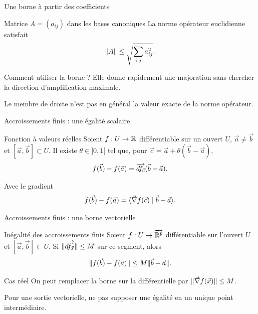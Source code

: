 \begin{frame}[t]{Une borne à partir des coefficients}
\coursanalyse
\begin{theoreme}{Matrice $A=(a_{ij})$ dans les bases canoniques}
La norme opérateur euclidienne satisfait
\[\lVert A\rVert\le\sqrt{\sum_{i,j}a_{ij}^2}.\]
\end{theoreme}
\begin{cours}{Comment utiliser la borne ?}
Elle donne rapidement une majoration sans chercher la direction d'amplification maximale.
\end{cours}
\vfill Le membre de droite n'est pas en général la valeur exacte de la norme opérateur.
\end{frame}

\begin{frame}[t]{Accroissements finis : une égalité scalaire}
\coursanalyse
\begin{theoreme}{Fonction à valeurs réelles}
Soient $f:U\to\mathbb R$ différentiable sur un ouvert $U$, $\vec a\ne\vec b$ et $[\vec a,\vec b]\subset U$.
Il existe $\theta\in]0,1[$ tel que, pour $\vec c=\vec a+\theta(\vec b-\vec a)$,
\[f(\vec b)-f(\vec a)=\overrightarrow{df_{\vec c}}(\vec b-\vec a).\]
\end{theoreme}
\begin{resultat}{Avec le gradient}
\[f(\vec b)-f(\vec a)=\langle \vec\nabla f(\vec c)\mid \vec b-\vec a\rangle.\]
\end{resultat}
\end{frame}

\begin{frame}[t]{Accroissements finis : une borne vectorielle}
\coursanalyse
\begin{theoreme}{Inégalité des accroissements finis}
Soient $f:U\to\overrightarrow{\mathbb R^{p}}$ différentiable sur l'ouvert $U$ et $[\vec a,\vec b]\subset U$.
Si $\lVert \overrightarrow{df_{\vec x}}\rVert\le M$ sur ce segment, alors
\[\lVert f(\vec b)-f(\vec a)\rVert\le M\lVert \vec b-\vec a\rVert.\]
\end{theoreme}
\begin{resultat}{Cas réel}
On peut remplacer la borne sur la différentielle par $\lVert \vec\nabla f(\vec x)\rVert\le M$.
\end{resultat}
\vfill Pour une sortie vectorielle, ne pas supposer une égalité en un unique point intermédiaire.
\end{frame}

